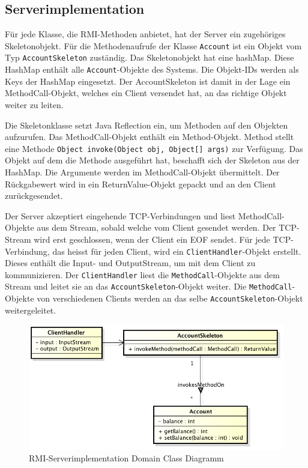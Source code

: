 \subsection{Serverimplementation}
\label{sec:serverimplementation}

Für jede Klasse, die RMI-Methoden anbietet, hat der Server ein
zuge\-hö\-ri\-ges Skeletonobjekt. Für die Methodenaufrufe
der Klasse \texttt{Account} ist ein Objekt vom Typ
\texttt{AccountSkeleton} zuständig. Das Skeletonobjekt hat eine \gls{hashMap}. Diese
HashMap enthält alle \texttt{Account}-Objekte des Systems. Die Objekt-IDs
werden als Keys der HashMap eingesetzt. Der AccountSkeleton ist damit
in der Lage ein MethodCall-Objekt, welches ein Client versendet hat, an
das richtige Objekt weiter zu leiten. 

Die Skeletonklasse setzt Java Reflection ein, um Methoden auf den
Objekten aufzurufen. Das MethodCall-Objekt enthält ein
Method-Objekt. Method stellt eine Methode \verb|Object invoke(Object obj, Object[] args)|\- zur\- Ver\-füg\-ung. Das Objekt auf dem die Methode
ausgeführt hat, beschafft sich der Skeleton aus der HashMap. Die
Argumente werden im MethodCall-Objekt übermittelt. Der Rückgabewert
wird in ein ReturnValue-Objekt gepackt und an den Client zurückgesendet.

Der Server akzeptiert eingehende TCP-Verbindungen und liest Method\-Call\--Objekte aus
dem Stream, sobald welche vom Client gesendet
werden. Der TCP-Stream wird erst geschlossen, wenn der Client ein EOF
sendet. Für jede TCP-Verbindung, das heisst für jeden Client, wird
ein \texttt{ClientHandler}-Objekt erstellt. Dieses enthält die Input-
und OutputStream, um mit dem Client zu kommunizieren. Der
\texttt{ClientHandler} liest die \texttt{MethodCall}-Objekte aus dem
Stream und leitet sie an das \texttt{AccountSkeleton}-Objekt weiter. Die
\texttt{Method\-Call}-Objekte von verschiedenen Clients werden an das selbe
\-\texttt{Ac\-count\-Skeleton}-Objekt weitergeleitet.

\begin{figure}[ht]
  \centering
\includegraphics[scale = 0.6]{images_objectcaching/rmiServerImpl}  
  \caption{RMI-Serverimplementation Domain Class Diagramm}
  \label{fig:rmiserverimpl}
\end{figure}

